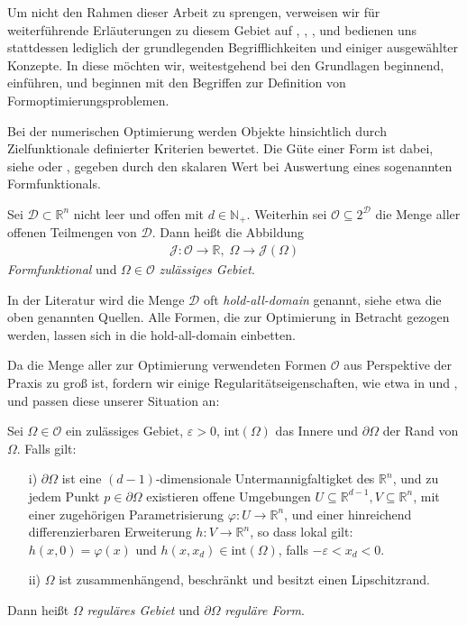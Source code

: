 Um nicht den Rahmen dieser Arbeit zu sprengen, verweisen wir für weiterführende Erläuterungen zu diesem Gebiet auf \cite{riemann}, \cite{riemann2},  \cite{shape_space}, und bedienen uns stattdessen lediglich der grundlegenden Begrifflichkeiten und einiger ausgewählter Konzepte. In diese möchten wir, weitestgehend bei den Grundlagen beginnend, einführen, und beginnen mit den Begriffen zur Definition von Formoptimierungsproblemen.

Bei der numerischen Optimierung werden Objekte hinsichtlich durch Zielfunktionale definierter Kriterien bewertet. Die Güte einer Form ist dabei, siehe \cite{shape_space} oder \cite{bfgs2}, gegeben durch den skalaren Wert bei Auswertung eines sogenannten Formfunktionals.

\begin{defi}[Formfunktional] %
Sei $\mathcal{D}\subset \mathbb{R}^n$ nicht leer und offen mit $d \in \mathbb{N}_+$. Weiterhin sei $\mathcal{O} \subseteq 2^{\mathcal{D}}$ die Menge aller offenen Teilmengen von $\mathcal{D}$. Dann heißt die Abbildung 
\begin{align*}
\mathcal{J}: \mathcal{O} \rightarrow \mathbb{R},\; \Omega \rightarrow \mathcal{J}(\Omega)
\end{align*}
\textit{Formfunktional} und $\Omega \in \mathcal{O}$ \textit{zulässiges Gebiet}.
\end{defi}

In der Literatur wird die Menge $\mathcal{D}$ oft \textit{hold-all-domain} genannt, siehe etwa die oben genannten Quellen. Alle Formen, die zur Optimierung in Betracht gezogen werden, lassen sich in die hold-all-domain einbetten.

Da die Menge aller zur Optimierung verwendeten Formen $\mathcal{O}$ aus Perspektive der Praxis zu groß ist, fordern wir einige Regularitätseigenschaften, wie etwa in \cite{Shape_diff} und \cite{sokol}, und passen diese unserer Situation an:

\begin{defi}\label{regu}
Sei $\Omega \in \mathcal{O}$ ein zulässiges Gebiet, $\varepsilon > 0$, $\text{int}(\Omega)$ das Innere und $\partial\Omega$ der Rand von $\Omega$. Falls gilt:
\begin{itemize}
\item[i)] $\partial \Omega$ ist eine $(d-1)$-dimensionale Untermannigfaltigket des $\mathbb{R}^n$, und zu jedem Punkt $p\in \partial \Omega$ existieren offene Umgebungen $U\subseteq \mathbb{R}^{d-1}, V\subseteq \mathbb{R}^n$, mit einer zugehörigen Parametrisierung $\varphi: U \rightarrow \mathbb{R}^n$, und einer hinreichend differenzierbaren Erweiterung $h: V \rightarrow \mathbb{R}^n$, so dass lokal gilt:\\
$h(x,0) = \varphi(x)$ und $h(x,x_d) \in \text{int}(\Omega)$, falls $-\varepsilon < x_d < 0$.
\item[ii)] $\Omega$ ist zusammenhängend, beschränkt und besitzt einen Lipschitzrand.
\end{itemize}
Dann heißt $\Omega$ \textit{reguläres Gebiet} und $\partial\Omega$ \textit{reguläre Form}.
\end{defi}

